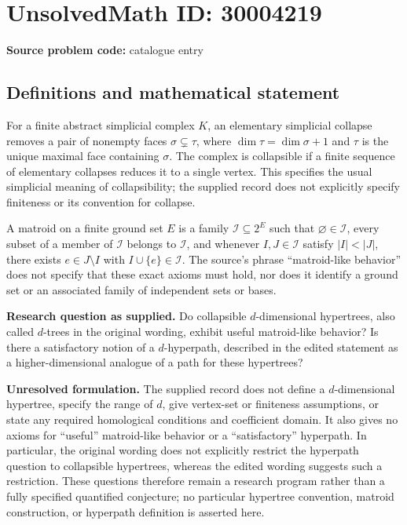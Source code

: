 \documentclass[11pt]{article}
\begin{document}
\section*{UnsolvedMath ID: 30004219}
\textbf{Source problem code:} catalogue entry
\subsection{Definitions and mathematical statement}
For a finite abstract simplicial complex \(K\), an elementary simplicial collapse removes a pair of nonempty faces \(\sigma\subsetneq\tau\), where \(\dim\tau=\dim\sigma+1\) and \(\tau\) is the unique maximal face containing \(\sigma\). The complex is collapsible if a finite sequence of elementary collapses reduces it to a single vertex. This specifies the usual simplicial meaning of collapsibility; the supplied record does not explicitly specify finiteness or its convention for collapse.

A matroid on a finite ground set \(E\) is a family \(\mathcal I\subseteq 2^E\) such that \(\varnothing\in\mathcal I\), every subset of a member of \(\mathcal I\) belongs to \(\mathcal I\), and whenever \(I,J\in\mathcal I\) satisfy \(|I|<|J|\), there exists \(e\in J\setminus I\) with \(I\cup\{e\}\in\mathcal I\). The source's phrase ``matroid-like behavior'' does not specify that these exact axioms must hold, nor does it identify a ground set or an associated family of independent sets or bases.

\textbf{Research question as supplied.} Do collapsible \(d\)-dimensional hypertrees, also called \(d\)-trees in the original wording, exhibit useful matroid-like behavior? Is there a satisfactory notion of a \(d\)-hyperpath, described in the edited statement as a higher-dimensional analogue of a path for these hypertrees?

\textbf{Unresolved formulation.} The supplied record does not define a \(d\)-dimensional hypertree, specify the range of \(d\), give vertex-set or finiteness assumptions, or state any required homological conditions and coefficient domain. It also gives no axioms for ``useful'' matroid-like behavior or a ``satisfactory'' hyperpath. In particular, the original wording does not explicitly restrict the hyperpath question to collapsible hypertrees, whereas the edited wording suggests such a restriction. These questions therefore remain a research program rather than a fully specified quantified conjecture; no particular hypertree convention, matroid construction, or hyperpath definition is asserted here.
\end{document}
